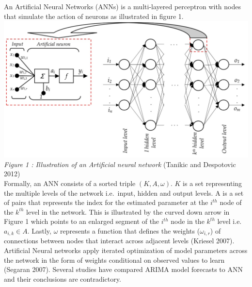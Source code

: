 \documentclass[12pt,a4paper]{article}
\numberwithin{equation}{section}
\numberwithin{figure}{section}
\numberwithin{table}{section}
\begin{document}
An Artificial Neural Networks (ANNs) is a multi-layered perceptron with
nodes that simulate the action of neurons as illustrated in figure 1.\\
\includegraphics{ANN.png}\\
\emph{Figure 1 : Illustration of an Artificial neural network} (Tanikic
and Despotovic 2012)\\
Formally, an ANN consists of a sorted triple \((K, A, \omega)\). \(K\)
is a set representing the multiple levels of the network i.e.~input,
hidden and output levels. A is a set of pairs that represents the index
for the estimated parameter at the \(i^{th}\) node of the \(k^{th}\)
level in the network. This is illustrated by the curved down arrow in
Figure 1 which points to an enlarged segment of the \(i^{th}\) node in
the \(k^{th}\) level i.e. \(a_{i,k} \in A\). Lastly, \(\omega\)
represents a function that defines the weights (\(\omega_{i,r}\)) of
connections between nodes that interact across adjacent levels (Kriesel
2007). Artificial Neural networks apply iterated optimization of model
parameters across the network in the form of weights conditional on
observed values to learn (Segaran 2007). Several studies have compared
ARIMA model forecasts to ANN and their conclusions are contradictory.
\end{document}
